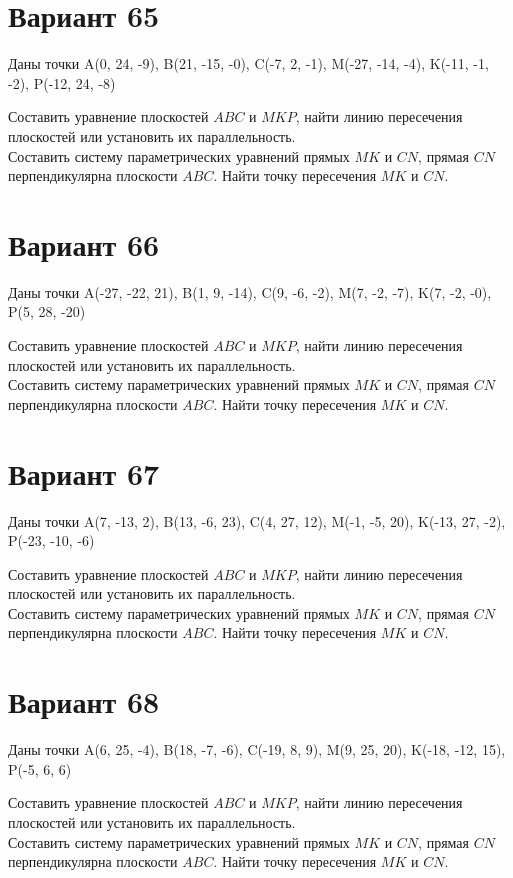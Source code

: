 \documentclass[11pt]{article}
\begin{document}
\section*{Вариант 65}
Даны точки A(0, 24, -9), B(21, -15, -0), C(-7, 2, -1), M(-27, -14, -4), K(-11, -1, -2), P(-12, 24, -8)

Составить уравнение плоскостей $ABC$ и $MKP$, найти линию пересечения плоскостей или установить их параллельность.\\
Составить систему параметрических уравнений прямых $MK$ и $CN$, прямая $CN$ перпендикулярна плоскости $ABC$. Найти точку пересечения $MK$ и $CN$.

\section*{Вариант 66}
Даны точки A(-27, -22, 21), B(1, 9, -14), C(9, -6, -2), M(7, -2, -7), K(7, -2, -0), P(5, 28, -20)

Составить уравнение плоскостей $ABC$ и $MKP$, найти линию пересечения плоскостей или установить их параллельность.\\
Составить систему параметрических уравнений прямых $MK$ и $CN$, прямая $CN$ перпендикулярна плоскости $ABC$. Найти точку пересечения $MK$ и $CN$.

\section*{Вариант 67}
Даны точки A(7, -13, 2), B(13, -6, 23), C(4, 27, 12), M(-1, -5, 20), K(-13, 27, -2), P(-23, -10, -6)

Составить уравнение плоскостей $ABC$ и $MKP$, найти линию пересечения плоскостей или установить их параллельность.\\
Составить систему параметрических уравнений прямых $MK$ и $CN$, прямая $CN$ перпендикулярна плоскости $ABC$. Найти точку пересечения $MK$ и $CN$.

\section*{Вариант 68}
Даны точки A(6, 25, -4), B(18, -7, -6), C(-19, 8, 9), M(9, 25, 20), K(-18, -12, 15), P(-5, 6, 6)

Составить уравнение плоскостей $ABC$ и $MKP$, найти линию пересечения плоскостей или установить их параллельность.\\
Составить систему параметрических уравнений прямых $MK$ и $CN$, прямая $CN$ перпендикулярна плоскости $ABC$. Найти точку пересечения $MK$ и $CN$.
\end{document}
